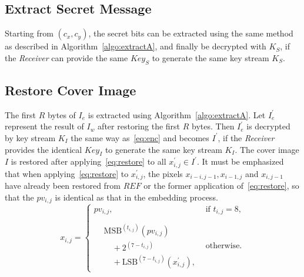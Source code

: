 \documentclass{elsarticle}
\begin{document}
	
	
	
	
	
	\subsection{Extract Secret Message}
	
	Starting from \((c_x, c_y)\), the secret bits can be extracted using the same method as described in Algorithm~\ref{algo:extractA}, and finally be decrypted with \(K_S\), if the \emph{Receiver} can provide the same \(Key_S\) to generate the same key stream \(K_S\).
	
	
	
	
	
	\subsection{Restore Cover Image}
	
	The first \(R\) bytes of \(I_e\) is extracted using Algorithm~\ref{algo:extractA}.
	Let \(I_e^\prime\) represent the result of \(I_w\) after restoring the first \(R\) bytes.
	Then \(I_e^\prime\) is decrypted by key stream \(K_I\) the same way as~\eqref{eq:enc} and becomes \(I^\prime\), if the \emph{Receiver} provides the identical \(Key_I\) to generate the same key stream \(K_I\).
	The cover image \(I\) is restored after applying~\eqref{eq:restore} to all \(x^\prime_{i, j} \in I^\prime\).
	It must be emphasized that when applying~\eqref{eq:restore} to \(x^\prime_{i, j}\), the pixels \(x_{i - i, j - 1}, x_{i - 1, j}\) and \(x_{i, j -1}\) have already been restored from \(REF\) or the former application of~\eqref{eq:restore}, so that the \(pv_{i, j}\) is identical as that in the embedding process.
	\begin{equation}
		\label{eq:restore}
		x_{i, j} =
		\begin{cases}
			pv_{i, j}                          ,& \text{if } t_{i, j} = 8, \\
			\\
			\begin{aligned}
				&\mathrm{MSB}^{(t_{i, j})}(pv_{i, j})  \\
				&\quad {+} 2^{(7 - t_{i, j})} \\
				&\quad {+} \mathrm{LSB}^{(7 - t_{i, j})}(x^\prime_{i, j}),
			\end{aligned} & \text{otherwise}.
		\end{cases}
	\end{equation}
	
\end{document}
